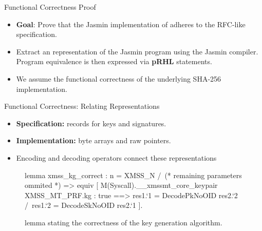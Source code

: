 \begin{frame}{Functional Correctness Proof}
  \begin{itemize}
      \setlength{\itemsep}{4mm}
      \item \textbf{Goal}: Prove that the Jasmin implementation of \xmssmt adheres to the
    RFC-like \EasyCrypt specification.
    \item Extract an \EasyCrypt representation of the Jasmin program
      using the Jasmin compiler. Program equivalence is then expressed via \textbf{pRHL} statements.
    \item We assume the functional correctness of the underlying SHA-256 implementation.
  \end{itemize}
\end{frame}

\begin{frame}[fragile]
  {Functional Correctness: Relating Representations}
  \begin{itemize}
      \setlength{\itemsep}{4mm}
    \item \textbf{Specification:} records for keys and signatures.
    \item \textbf{Implementation:} byte arrays and raw pointers.
    \item Encoding and decoding operators connect these representations
  \end{itemize}
  \vspace{1mm}

  \begin{figure}[t!]
    \centering
    \begin{minipage}{.65\textwidth}
      \begin{easycrypt}[basicstyle=\fontsize{7}{8}\selectfont\ttfamily]{}{}
lemma xmss_kg_correct : 
    n = XMSS_N /\ (* remaining parameters ommited *) =>
    equiv [
      M(Syscall).__xmssmt_core_keypair ~ XMSS_MT_PRF.kg :
      true 
      ==>
      res{1}.`1 = DecodePkNoOID res{2}.`2 /\
      res{1}.`2 = DecodeSkNoOID res{2}.`1
    ].\end{easycrypt}
    \end{minipage}
    \caption{\EasyCrypt lemma stating the correctness of the key generation algorithm.}
  \end{figure}
\end{frame}

